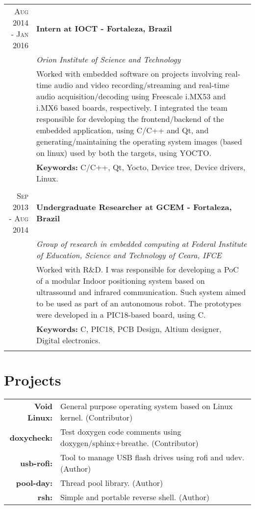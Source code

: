 \documentclass[a4paper,10pt]{article}
\begin{document}
\begin{tabular}{r|p{11cm}}
  \textsc{Aug 2014 - Jan 2016} & \textbf{Intern at IOCT - Fortaleza, Brazil}\\&\emph{Orion Institute of Science and Technology}\\&\footnotesize{Worked with embedded software on projects involving real-time audio and video recording/streaming and real-time audio acquisition/decoding using Freescale i.MX53 and i.MX6 based boards, respectively. I integrated the team responsible for developing the frontend/backend of the embedded application, using C/C++ and Qt, and generating/maintaining the operating system images (based on linux) used by both the targets, using YOCTO.}
  \\ & \footnotesize{\textbf{Keywords:} C/C++, Qt, Yocto, Device tree, Device drivers, Linux.}
  \\\multicolumn{2}{c}{} \\

  \textsc{Sep 2013 - Aug 2014} & \textbf{Undergraduate Researcher at GCEM - Fortaleza, Brazil} \\&\emph{Group of research in embedded computing at Federal Institute of Education,
  Science and Technology of Ceara, IFCE}\\&\footnotesize{Worked with R\&D. I was responsible for developing a PoC of a modular Indoor positioning system based on ultrassound and infrared communication. Such system aimed to be used as part of an autonomous robot. The prototypes were developed in a PIC18-based board, using C.}
  \\ & \footnotesize{\textbf{Keywords:} C, PIC18, PCB Design, Altium designer, Digital electronics.}
  \\\multicolumn{2}{c}{}

\end{tabular}

\section{Projects}
\begin{tabular}{rl}
  \textbf{Void Linux:}& General purpose operating system based on Linux kernel. (Contributor)\\
  \textbf{doxycheck:}& Test doxygen code comments using doxygen/sphinx+breathe. (Contributor)\\
  \textbf{usb-rofi:}& Tool to manage USB flash drives using rofi and udev. (Author)\\
  \textbf{pool-day:}& Thread pool library. (Author)\\
  \textbf{rsh:}& Simple and portable reverse shell. (Author)\\
\end{tabular} \\
\end{document}

